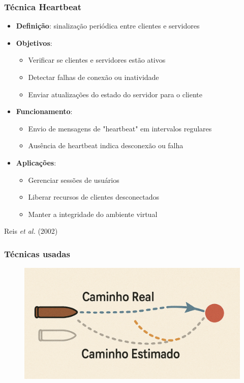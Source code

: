\documentclass{beamer}
\begin{document}
\begin{frame}
  \frametitle{Técnica Heartbeat}
  \begin{itemize}
    \item \textbf{Definição}: sinalização periódica entre clientes e servidores
    \item \textbf{Objetivos}:
    \begin{itemize}
      \item Verificar se clientes e servidores estão ativos
      \item Detectar falhas de conexão ou inatividade
      \item Enviar atualizações do estado do servidor para o cliente
    \end{itemize}
    \item \textbf{Funcionamento}:
    \begin{itemize}
      \item Envio de mensagens de "heartbeat" em intervalos regulares
      \item Ausência de heartbeat indica desconexão ou falha
    \end{itemize}
    \item \textbf{Aplicações}:
    \begin{itemize}
      \item Gerenciar sessões de usuários
      \item Liberar recursos de clientes desconectados
      \item Manter a integridade do ambiente virtual
    \end{itemize}
  \end{itemize}
  \begin{flushright}
    \scriptsize
    Reis \textit{et al.} (2002)
  \end{flushright}
\end{frame}

\begin{frame}
  \frametitle{Técnicas usadas}
  \begin{figure}[h]
    \centering
    \vspace{-18pt}
    \includegraphics[width=1.03\textwidth]{imagem_83_nova.png}
    \vspace{-20pt}
  \end{figure}
\end{frame}
\end{document}
